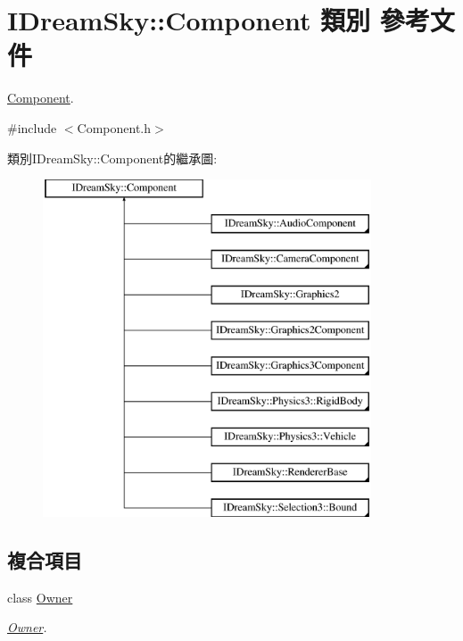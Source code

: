 \hypertarget{class_i_dream_sky_1_1_component}{}\section{I\+Dream\+Sky\+:\+:Component 類別 參考文件}
\label{class_i_dream_sky_1_1_component}


\hyperlink{class_i_dream_sky_1_1_component}{Component}.  




{\ttfamily \#include $<$Component.\+h$>$}

類別\+I\+Dream\+Sky\+:\+:Component的繼承圖\+:\begin{figure}[H]
\begin{center}
\leavevmode
\includegraphics[height=10.000000cm]{class_i_dream_sky_1_1_component}
\end{center}
\end{figure}
\subsection*{複合項目}
\begin{DoxyCompactItemize}
\item 
class \hyperlink{class_i_dream_sky_1_1_component_1_1_owner}{Owner}
\begin{DoxyCompactList}\small\item\em \hyperlink{class_i_dream_sky_1_1_component_1_1_owner}{Owner}. \end{DoxyCompactList}\end{DoxyCompactItemize}
